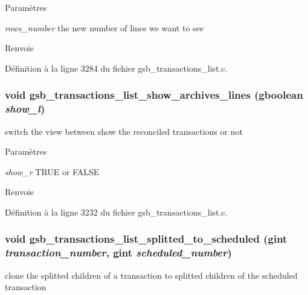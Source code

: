 \begin{DoxyParams}{Paramètres}
\item[{\em rows\_\-number}]the new number of lines we want to see\end{DoxyParams}
\begin{DoxyReturn}{Renvoie}

\end{DoxyReturn}


Définition à la ligne 3284 du fichier gsb\_\-transactions\_\-list.c.

\subsubsection[{gsb\_\-transactions\_\-list\_\-show\_\-archives\_\-lines}]{\setlength{\rightskip}{0pt plus 5cm}void gsb\_\-transactions\_\-list\_\-show\_\-archives\_\-lines (gboolean {\em show\_\-l})}\label{gsb__transactions__list_8c_a7a066474fae8e311ca096b15cf9d33cc}
switch the view between show the reconciled transactions or not


\begin{DoxyParams}{Paramètres}
\item[{\em show\_\-r}]TRUE or FALSE\end{DoxyParams}
\begin{DoxyReturn}{Renvoie}

\end{DoxyReturn}


Définition à la ligne 3232 du fichier gsb\_\-transactions\_\-list.c.

\subsubsection[{gsb\_\-transactions\_\-list\_\-splitted\_\-to\_\-scheduled}]{\setlength{\rightskip}{0pt plus 5cm}void gsb\_\-transactions\_\-list\_\-splitted\_\-to\_\-scheduled (gint {\em transaction\_\-number}, \/  gint {\em scheduled\_\-number})}\label{gsb__transactions__list_8c_a0ea3d83f0d74d289b6ae23c495f4aa7d}
clone the splitted children of a transaction to splitted children of the scheduled transaction


